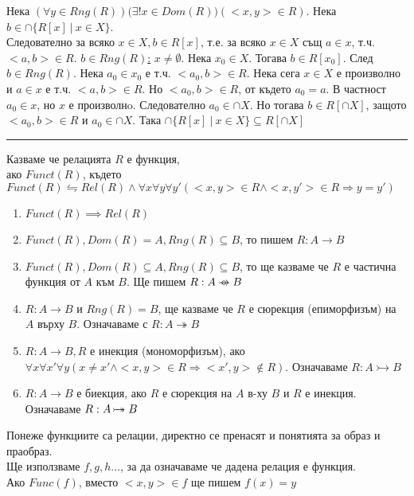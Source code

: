 \documentclass[fleqn, titlepage, 12pt]{report}
\newcommand*\rightbijectionarrow{\mathrel{\ooalign{$\twoheadrightarrow$\cr\hidewidth\hbox{$\rightarrowtail\mkern 1mu$}\cr}}}
\newcommand*\rightcircarrow{\mathrel{\ooalign{$\rightarrow$\cr\hidewidth\hbox{$\circ\mkern 5mu$}\cr}}}
\begin{document}
\bigbreak
Нека $(\forall{y \in Rng(R)})(\exists{!x \in Dom(R))(<x,y> \in R)}$. Нека $b \in \cap \{R[x]\ |\ x \in X\}$.\\
Следователно за всяко $x \in X, b \in R[x]$, т.е. за всяко $x \in X$ същ $a \in x$,
т.ч. $<a,b> \in R$.
\bigbreak
\underline{$b \in Rng(R)$:} $x \neq \emptyset$. Нека $x_0 \in X$. Тогава $b \in R[x_0]$. След $b \in Rng(R)$.
Нека $a_0 \in x_0$ е т.ч. $<a_0,b> \in R$. Нека сега $x \in X$ е произволно и $a \in x$ е т.ч. $<a,b> \in R$.
Но $<a_0,b> \in R$, от където $a_0 = a$. В частност $a_0 \in x$, но $x$ е произволнo. Следователно $a_0 \in \cap X$.
Но тогава $b \in R[\cap X]$, защото $<a_0,b> \in R$ и $a_0 \in \cap X$.
Така $\cap \{R[x]\ |\ x \in X\} \subseteq R[\cap X]$
\bigbreak

\bigbreak
\hrule
\begin{center}
\end{center}

\bigbreak
{} Казваме че релацията $R$ е функция, \\
ако $Funct(R)$, където $Funct(R) \leftrightharpoons Rel(R) \land  \forall{x}\forall{y}\forall{y'}(<x,y> \in R \land  <x,y'> \in R \Rightarrow y = y')$
\bigbreak

\begin{enumerate}
  \item $Funct(R) \implies Rel(R)$
  \item $Funct(R), Dom(R) = A, Rng(R) \subseteq B$, то пишем $R: A \rightarrow B$
  \item $Funct(R), Dom(R) \subseteq A , Rng (R) \subseteq B$, то ще казваме че $R$ е частична функция от $A$ към $B$.
    Ще пишем $R: A \rightcircarrow B$
  \item $R: A \rightarrow B$ и $Rng(R) = B$, ще казваме че $R$ е сюрекция (епиморфизъм) на $A$ върху $B$.
    Означаваме с $R: A \twoheadrightarrow B$
  \item $R: A \rightarrow B, R$ е инекция (мономорфизъм),
    ако $\forall{x}\forall{x'}\forall{y}(x \neq x' \land <x,y> \in R \Rightarrow <x',y> \notin R)$.
    Означаваме $R: A \rightarrowtail B$
  \item $R: A \rightarrow B$ е биекция, ако $R$ е сюрекция на $A$ в-ху $B$ и $R$ е инекция.
    Означаваме $R: A \rightbijectionarrow B$
\end{enumerate}
\bigbreak

Понеже функциите са релации, директно се пренасят и понятията за образ и праобраз.\\
Ще използваме $f,g,h ...$, за да означаваме че дадена релация е функция.\\
Ако $Func(f)$, вместо $<x,y> \in f$ ще пишем $f(x) = y$
\bigbreak
\end{document}
